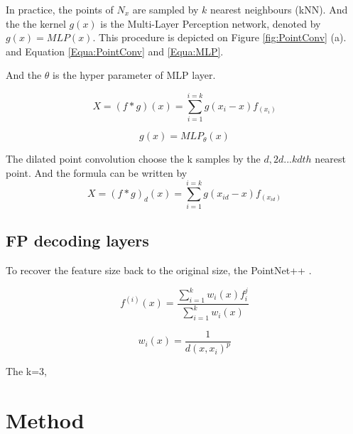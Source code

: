 \documentclass[runningheads]{llncs}
\begin{document}
In practice, the points of $N_{x}$ are sampled by $k$ nearest neighbours (kNN). And the the kernel $g(x)$ is the Multi-Layer Perception network, denoted by $g(x)=MLP(x)$. This procedure is depicted on Figure \ref{fig:PointConv} (a). and Equation \ref{Equa:PointConv} and \ref{Equa:MLP}.

And the $\theta$ is the hyper parameter of MLP layer. 

\begin{equation}
    X = (f*g)(x) = \sum_{i=1}^{i=k}g(x_{i}-x)f_(x_{i})
    \label{Equa:PointConv}
\end{equation}

\begin{equation}
    g(x) = MLP_{\theta}(x)
    \label{Equa:MLP}
\end{equation}

The dilated point convolution \cite{DPC} choose the k samples by the $d,2d...kdth$ nearest point. And the formula can be written by 
\begin{equation}
    X = (f*g)_{d}(x) = \sum_{i=1}^{i=k}g(x_{id}-x)f_(x_{id})
    \label{Equa:DilatedPointConv}
\end{equation}

\subsection{FP decoding layers}

To recover the feature size back to the original size, the PointNet++ \cite{pointnet++}. 

\begin{equation}
    f^{(i)}(x)=\frac{\sum_{i=1}^{k} w_{i}(x) f_{i}^{j}}{\sum_{i=1}^{k} w_{i}(x)} 
\end{equation}

\begin{equation}
 w_{i}(x)=\frac{1}{d(x,x_{i})^p}
\end{equation}


The k=3,




\section{Method}

\end{document}

